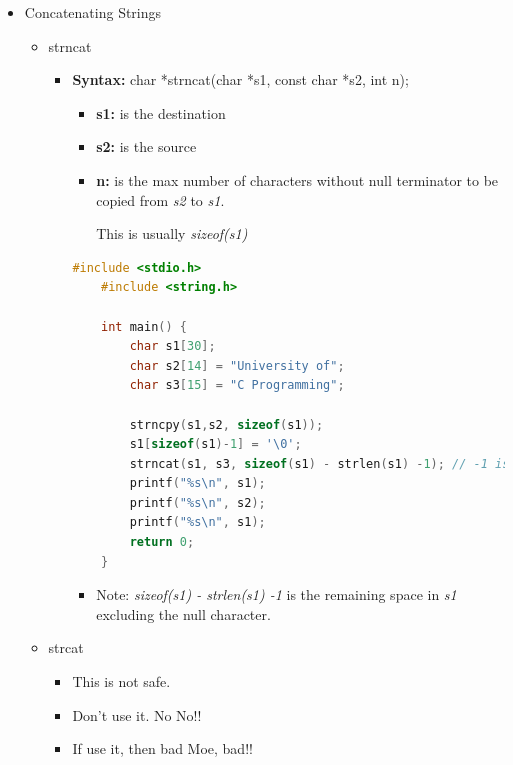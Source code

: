 \documentclass[12pt]{article}
\begin{document}
\bigskip

\begin{itemize}
    \item Concatenating Strings
    \begin{itemize}
        \item strncat
        \begin{itemize}
            \item \textbf{Syntax:} char *strncat(char *s1, const char *s2, int n);
            \begin{itemize}
                \item \textbf{s1:} is the destination
                \item \textbf{s2:} is the source
                \item \textbf{n:} is the max number of characters without null terminator
                to be copied from \textit{s2} to \textit{s1}.

                \bigskip

                This is usually \textit{sizeof(s1)}
            \end{itemize}

    \begin{lstlisting}[language=c,caption={strings\_example\_5.c}]
    #include <stdio.h>
    #include <string.h>

    int main() {
        char s1[30];
        char s2[14] = "University of";
        char s3[15] = "C Programming";

        strncpy(s1,s2, sizeof(s1));
        s1[sizeof(s1)-1] = '\0';
        strncat(s1, s3, sizeof(s1) - strlen(s1) -1); // -1 is for \0.
        printf("%s\n", s1);
        printf("%s\n", s2);
        printf("%s\n", s1);
        return 0;
    }
    \end{lstlisting}

        \bigskip

        \begin{itemize}
            \item Note: \textit{sizeof(s1) - strlen(s1) -1} is the remaining space
            in \textit{s1} excluding the null character.
        \end{itemize}

        \end{itemize}
        \item strcat
        \begin{itemize}
            \item This is not safe.
            \item Don't use it. No No!!
            \item If use it, then bad Moe, bad!!
        \end{itemize}
    \end{itemize}
\end{itemize}
\end{document}
